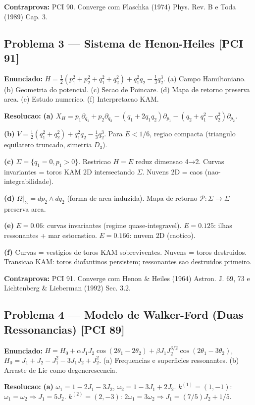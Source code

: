 \documentclass[12pt,a4paper,oneside]{article}
\begin{document}
\textbf{Contraprova:} PCI 90. Converge com Flaschka (1974) Phys. Rev. B e Toda (1989) Cap. 3.

\subsection{Problema 3 — Sistema de Henon-Heiles [PCI 91]}
\textbf{Enunciado:} $H=\frac12(p_1^2+p_2^2+q_1^2+q_2^2)+q_1^2q_2-\frac13 q_2^3$.
(a) Campo Hamiltoniano. (b) Geometria do potencial. (c) Secao de Poincare.
(d) Mapa de retorno preserva area. (e) Estudo numerico. (f) Interpretacao KAM.

\textbf{Resolucao:}
\textbf{(a)} $X_H=p_1\partial_{q_1}+p_2\partial_{q_2}-(q_1+2q_1q_2)\partial_{p_1}-(q_2+q_1^2-q_2^2)\partial_{p_2}$.

\textbf{(b)} $V=\frac12(q_1^2+q_2^2)+q_1^2q_2-\frac13q_2^3$. Para $E<1/6$, regiao compacta (triangulo equilatero truncado, simetria $D_3$).

\textbf{(c)} $\Sigma=\{q_1=0,p_1>0\}$. Restricao $H=E$ reduz dimensao 4→2. Curvas invariantes = toros KAM 2D intersectando $\Sigma$. Nuvens 2D = caos (nao-integrabilidade).

\textbf{(d)} $\Omega|_\Sigma=dp_2\wedge dq_2$ (forma de area induzida). Mapa de retorno $\mathcal{P}:\Sigma\to\Sigma$ preserva area.

\textbf{(e)} $E=0.06$: curvas invariantes (regime quase-integravel). $E=0.125$: ilhas ressonantes + mar estocastico. $E=0.166$: nuvem 2D (caotico).

\textbf{(f)} Curvas = vestigios de toros KAM sobreviventes. Nuvens = toros destruidos. Transicao KAM: toros diofantinos persistem; ressonantes sao destruidos primeiro.

\textbf{Contraprova:} PCI 91. Converge com Henon \& Heiles (1964) Astron. J. 69, 73 e Lichtenberg \& Lieberman (1992) Sec. 3.2.

\subsection{Problema 4 — Modelo de Walker-Ford (Duas Ressonancias) [PCI 89]}
\textbf{Enunciado:} $H=H_0+\alpha J_1J_2\cos(2\theta_1-2\theta_2)+\beta J_1J_2^{3/2}\cos(2\theta_1-3\theta_2)$,
$H_0=J_1+J_2-J_1^2-3J_1J_2+J_2^2$.
(a) Frequencias e superficies ressonantes. (b) Arraste de Lie como degenerescencia.

\textbf{Resolucao:}
\textbf{(a)} $\omega_1=1-2J_1-3J_2$, $\omega_2=1-3J_1+2J_2$.
$k^{(1)}=(1,-1)$: $\omega_1=\omega_2\Rightarrow J_1=5J_2$.
$k^{(2)}=(2,-3)$: $2\omega_1=3\omega_2\Rightarrow J_1=(7/5)J_2+1/5$.
\end{document}
